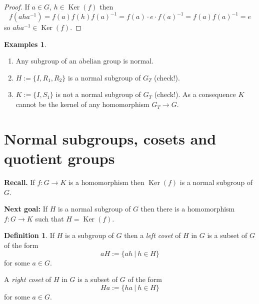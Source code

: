 \documentclass[12pt, letterpaper, oneside]{article}
\theoremstyle{plain}
\theoremstyle{definition}
\newtheorem{definition}[theorem]{Definition}
\newtheorem{examples}[theorem]{Examples}
\newcommand{\Ker}{\operatorname{Ker}}
\newcommand{\benu}{\begin{enumerate}}
\newcommand{\eenu}{\end{enumerate}}
\newcommand{\vs}{\vskip 5mm}
\begin{document}
\begin{proof}
If $a\in G$, $h\in \Ker(f)$ then 
$$f(aha^{-1}) = f(a)f(h)f(a)^{-1} = f(a)\cdot e\cdot f(a)^{-1} = f(a)f(a)^{-1} = e$$
so $aha^{-1}\in \Ker(f)$.
\end{proof}


\vs 

\begin{examples}\hfill

\vskip -13mm

\ 
\benu
\item Any subgroup of an abelian group is normal.
\item $H:=\{I, R_{1}, R_{2} \}$ is a normal subgroup of $G_{T}$ (check!). 
\item $K:=\{I , S_{1}\}$ is not a normal subgroup of $G_{T}$ (check!). As a consequence 
$K$ cannot be the kernel of any homomorphism $G_{T} \to G$.
\eenu
\end{examples}








\newpage
\section{Normal subgroups, cosets and quotient groups}
\label{SEC_COSETS}

\textbf{Recall.} If $f\colon G\to K$ is a homomorphism then $\Ker(f)$ is a normal subgroup 
of $G$. 

\textbf{Next goal:} If $H$ is a normal subgroup of $G$ then there is a homomorphism 
$f\colon G\to K$ such that $H = \Ker(f)$. 



\vs

\vs 


\begin{definition}
If $H$ is a subgroup of $G$ then a \emph{left coset} of $H$ in $G$ is a subset of $G$
of the form 
$$aH := \{ah \ | \ h\in H\}$$
for some $a\in G$. 

A \emph{right coset} of $H$ in $G$ is a subset of $G$
of the form 
$$Ha := \{ha \ | \ h\in H\}$$
for some $a\in G$. 
\end{definition}
\end{document}
